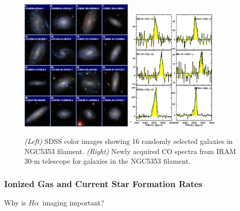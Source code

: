 \documentclass[12pt, preprint]{aastex}
\newcommand{\ha}{$H\alpha$}
\begin{document}
\begin{figure}[h]
\centering
\includegraphics[width=0.48\textwidth]{sdss-montage.png}
\includegraphics[width=0.4\textwidth]{CO-detection.png}
\caption{\small {\it (Left)} SDSS color images showing 16 randomly
  selected galaxies in NGC5353 filament.  {\it (Right)} Newly acquired
  CO spectra
  from IRAM 30-m telescope for galaxies in the NGC5353 filament.  }
\label{sdssCO}
\end{figure}


\vspace*{-1cm}
\subsubsection{Ionized Gas and Current Star Formation Rates}
\vspace*{-.3cm}
Why is \ha \ imaging important?
\end{document}
